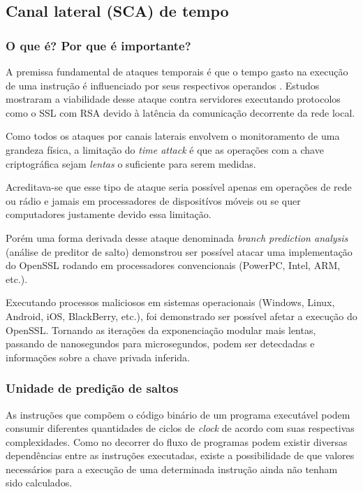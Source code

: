 \subsection{Canal lateral (SCA) de tempo}

\subsubsection{O que é? Por que é importante?}
A premissa fundamental de ataques temporais \'{e} que o tempo gasto na execu\c{c}\~{a}o de uma instru\c{c}\~{a}o \'{e} influenciado por seus respectivos operandos \cite{ECCBook_HankersonVanstone2004}. Estudos mostraram \cite{1251354} a viabilidade desse ataque contra servidores executando protocolos como o SSL com RSA devido à lat\^{e}ncia da comunica\c{c}\~{a}o decorrente da rede local.

Como todos os ataques por canais laterais envolvem o monitoramento de uma grandeza f\'{i}sica, a limita\c{c}\~{a}o do \textit{time attack} \'{e} que as opera\c{c}\~{o}es com a chave criptogr\'{a}fica sejam \textit{lentas} o suficiente para serem medidas.

Acreditava-se que esse tipo de ataque seria poss\'{i}vel apenas em opera\c{c}\~{o}es de rede ou r\'{a}dio e jamais em processadores de disposit\'{i}vos m\'{o}veis ou se quer computadores justamente devido essa limita\c{c}\~{a}o.

Por\'{e}m uma forma derivada desse ataque denominada \textit{branch prediction analysis} (an\'{a}lise de preditor de salto) \cite{1266999} demonstrou ser poss\'{i}vel atacar uma implementa\c{c}\~{a}o do OpenSSL rodando em processadores convencionais (PowerPC, Intel, ARM, etc.).

Executando processos maliciosos em sistemas operacionais (Windows, Linux, Android, iOS, BlackBerry, etc.), foi demonstrado ser poss\'{i}vel afetar a execu\c{c}\~{a}o do OpenSSL. Tornando as itera\c{c}\~{o}es da exponencia\c{c}\~{a}o modular mais lentas, passando de nanosegundos para microsegundos, podem ser detecdadas e informações sobre a chave privada inferida.

\subsubsection*{Unidade de predi\c{c}\~{a}o de saltos}

As instru\c{c}\~{o}es que comp\~{o}em o c\'{o}digo bin\'{a}rio de um programa execut\'{a}vel podem consumir diferentes quantidades de ciclos de \textit{clock} de acordo com suas respectivas complexidades. Como no decorrer do fluxo de programas podem existir diversas depend\^{e}ncias entre as instru\c{c}\~{o}es executadas, existe a possibilidade de que valores necess\'{a}rios para a execu\c{c}\~{a}o de uma determinada instru\c{c}\~{a}o ainda n\~{a}o tenham sido calculados.

